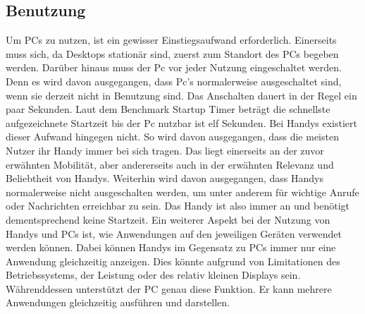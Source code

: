 \subsection{Benutzung}
	Um PCs zu nutzen, ist ein gewisser Einstiegsaufwand erforderlich. %
		Einerseits muss sich, da Desktops stationär sind, zuerst zum Standort des PCs begeben werden. %
		Darüber hinaus muss der Pc vor jeder Nutzung eingeschaltet werden. Denn es wird davon ausgegangen, dass Pc's normalerweise ausgeschaltet sind, wenn sie derzeit nicht in Benutzung sind. Das Anschalten dauert in der Regel ein paar Sekunden. Laut dem Benchmark \glqq Startup Timer\grqq{} beträgt die schnellste aufgezeichnete Startzeit bis der Pc nutzbar ist elf Sekunden\cite{pcVsphone_boottime}.\newline%
	Bei Handys existiert dieser Aufwand hingegen nicht. %
		So wird davon ausgegangen, dass die meisten Nutzer ihr Handy immer bei sich tragen. Das liegt einerseits an der zuvor erwähnten Mobilität, aber andererseits auch in der  erwähnten Relevanz und Beliebtheit von Handys. %
		Weiterhin wird davon ausgegangen, dass Handys normalerweise nicht ausgeschalten werden, um unter anderem für wichtige Anrufe oder Nachrichten erreichbar zu sein. Das Handy ist also immer an und benötigt dementsprechend keine Startzeit.\newline%
Ein weiterer Aspekt bei der Nutzung von Handys und PCs ist, wie Anwendungen auf den jeweiligen Geräten verwendet werden können. %
	Dabei können Handys im Gegensatz zu PCs immer nur eine Anwendung gleichzeitig anzeigen. Dies könnte aufgrund von Limitationen des Betriebssystems, der Leistung oder des relativ kleinen Displays sein.\newline%
	Währenddessen unterstützt der PC genau diese Funktion. Er kann mehrere Anwendungen gleichzeitig ausführen und darstellen.%
	
	
%
%
